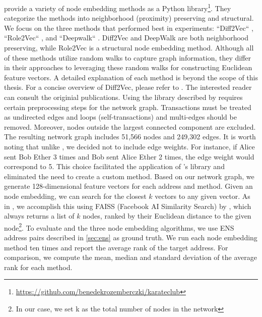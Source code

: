 \documentclass[12pt,a4paper,titlepage,oneside,english]{article}
\begin{document}
\cite{karateclub} provide a variety of node embedding methods as a Python library\footnote{\url{https://github.com/benedekrozemberczki/karateclub}}. They categorize the methods into neighborhood (proximity) preserving and structural. \newline
We focus on the three methods that performed best in \cite{Beres2020} experiments: ``Diff2Vec`` \citep{rozemberczki2020difftovec}, ``Role2Vec`` \citep{ahmed2018roletovec}, and ``Deepwalk`` \citep{perozzi2014}. Diff2Vec and DeepWalk are both neighborhood preserving, while Role2Vec is a structural node embedding method. Although all of these methods utilize random walks to capture graph information, they differ in their approaches to leveraging these random walks for constructing Euclidean feature vectors. A detailed explanation of each method is beyond the scope of this thesis. For a concise overview of Diff2Vec, please refer to \cite{wu2022tutela}. The interested reader can consult the originial publications. \newline
Using the library described by \cite{karateclub} requires certain preprocessing steps for the network graph. Transactions must be treated as undirected edges and loops (self-transactions) and multi-edges should be removed. Moreover, nodes outside the largest connected component are excluded. The resulting network graph includes 51,566 nodes and 249,302 edges. \newline
It is worth noting that unlike \cite{wu2022tutela}, we decided not to include edge weights. For instance, if Alice sent Bob Ether 3 times and Bob sent Alice Ether 2 times, the edge weight would correspond to 5. This choice facilitated the application of \cite{rozemberczki2020difftovec}'s library and eliminated the need to create a custom method. \newline
Based on our network graph, we generate 128-dimensional feature vectors for each address and method. \newline
Given an node embedding, we can search for the closest $k$ vectors to any given vector. As in \cite{wu2022tutela}, we accomplish this using FAISS (Facebook AI Similarity Search) by \cite{johnson2019faiss}, which always returns a list of $k$ nodes, ranked by their Euclidean distance to the given node\footnote{In our case, we set k as the total number of nodes in the network}. \newline
To evaluate and the three node embedding algorithms, we use ENS address pairs described in \ref{sec:ens} as ground truth. We run each node embedding method ten times and report the average rank of the target address. For comparison, we  compute the mean, median and standard deviation of the average rank for each method.
\end{document}
